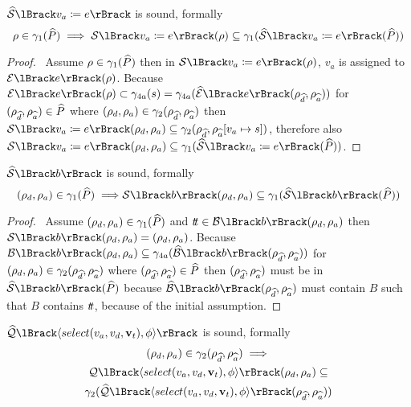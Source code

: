 \begin{conjecture}
    \label{thm:sound-assign}
    $\abssem{v_a \coloneqq e}$ is sound, formally
    \begin{equation*}
    \environment \in \concrete_1(\ab{P}) \implies \sem{v_a \coloneqq e}(\environment) \subseteq \concrete_1(\abssem{v_a \coloneqq e}(\ab{P}))
    \end{equation*}
\end{conjecture}


\begin{proof}
    \pf\
    Assume $\rho \in \gamma_1(\widehat{P})$ then in $\sem{v_a \coloneqq e}(\environment)$, $v_a$ is assigned to $\expsem{e}(\environment)$.
    Because $\expsem{e}(\environment) \subset \concrete_{4a}(s) = \concrete_{4a}(\absexpsem{e}(\env{\ab{d}}, \env{\ab{a}}))$ for $(\rho_{\widehat{d}}, \rho_{\widehat{a}}) \in \widehat{P}$ where $(\rho_{d}, \rho_{a}) \in \gamma_2(\rho_{\widehat{d}}, \rho_{\widehat{a}})$ then $\sem{v_a \coloneqq e}(\env{d}, \env{a}) \subseteq \concrete_2(\env{\ab{d}}, \env{\ab{a}}[v_a \mapsto s])$, therefore also $\sem{v_a \coloneqq e}(\env{d}, \env{a}) \subseteq \concrete_1(\abssem{v_a \coloneqq e}(\ab{P}))$.
\end{proof}


\begin{conjecture}
    \label{thm:sound-boolsem}
    $\abssem{b}$ is sound, formally
    \begin{equation*}
    (\rho_d, \rho_a)
        \in \concrete_1(\ab{P}) \implies \\
        \sem{b}(\rho_d, \rho_a) \subseteq \concrete_1(\abssem{b}(\ab{P}))
    \end{equation*}
\end{conjecture}


\begin{proof}
    \pf\
    Assume $(\rho_{d}, \rho_{a}) \in \gamma_1(\widehat{P})$ and $\true \in \boolsem{b}(\env{d}, \env{a})$ then $\sem{b}(\env{d}, \env{a}) = (\env{d}, \env{a})$.
    Because $\boolsem{b}(\env{d}, \env{a}) \subseteq \concrete_{4a}(\absboolsem{b}(\env{\ab{d}}, \env{\ab{a}}))$ for $(\rho_{d}, \rho_{a}) \in \gamma_2(\rho_{\widehat{d}}, \rho_{\widehat{a}})$ where $(\rho_{\widehat{d}}, \rho_{\widehat{a}}) \in \widehat{P}$ then $(\rho_{\widehat{d}}, \rho_{\widehat{a}})$ must be in $\abssem{b}(\ab{P})$ because $\absboolsem{b}(\env{\ab{d}}, \env{\ab{a}})$ must contain $B$ such that $B$ contains $t\!t$, because of the initial assumption.
\end{proof}


\begin{conjecture}
    \label{thm:sound-select}
    $\abssqlsem{\langle select(v_a, v_d, \mathbf{v}_t), \phi \rangle}$ is sound, formally
    \begin{multline*}
    (\rho_d, \rho_a)
        \in \concrete_2(\rho_{\ab{d}}, \rho_{\ab{a}}) \implies \\
        \sqlsem{\langle select(v_a, v_d, \mathbf{v}_t), \phi \rangle}(\rho_d, \rho_a) \subseteq \\
        \concrete_2(\abssqlsem{\langle select(v_a, v_d, \mathbf{v}_t), \phi \rangle}(\rho_{\ab{d}}, \rho_{\ab{a}}))
    \end{multline*}
\end{conjecture}


